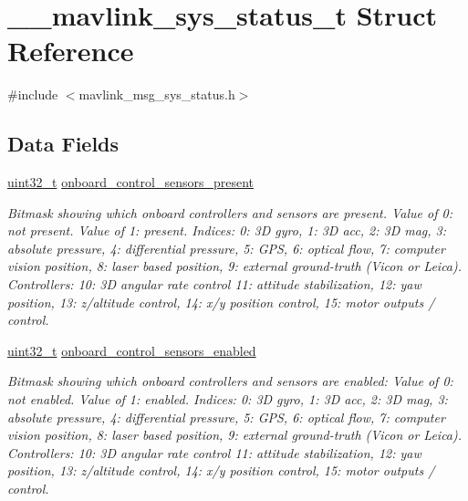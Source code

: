 \hypertarget{struct____mavlink__sys__status__t}{\section{\-\_\-\-\_\-mavlink\-\_\-sys\-\_\-status\-\_\-t Struct Reference}
\label{struct____mavlink__sys__status__t}
}


{\ttfamily \#include $<$mavlink\-\_\-msg\-\_\-sys\-\_\-status.\-h$>$}

\subsection*{Data Fields}
\begin{DoxyCompactItemize}
\item 
\hyperlink{stdint_8h_a435d1572bf3f880d55459d9805097f62}{uint32\-\_\-t} \hyperlink{struct____mavlink__sys__status__t_a9c506f0a78266af5a1230eb1a0ca78b9}{onboard\-\_\-control\-\_\-sensors\-\_\-present}
\begin{DoxyCompactList}\small\item\em Bitmask showing which onboard controllers and sensors are present. Value of 0\-: not present. Value of 1\-: present. Indices\-: 0\-: 3\-D gyro, 1\-: 3\-D acc, 2\-: 3\-D mag, 3\-: absolute pressure, 4\-: differential pressure, 5\-: G\-P\-S, 6\-: optical flow, 7\-: computer vision position, 8\-: laser based position, 9\-: external ground-\/truth (Vicon or Leica). Controllers\-: 10\-: 3\-D angular rate control 11\-: attitude stabilization, 12\-: yaw position, 13\-: z/altitude control, 14\-: x/y position control, 15\-: motor outputs / control. \end{DoxyCompactList}\item 
\hyperlink{stdint_8h_a435d1572bf3f880d55459d9805097f62}{uint32\-\_\-t} \hyperlink{struct____mavlink__sys__status__t_ac7217643b5de2bd8fe861b0c9ff7277c}{onboard\-\_\-control\-\_\-sensors\-\_\-enabled}
\begin{DoxyCompactList}\small\item\em Bitmask showing which onboard controllers and sensors are enabled\-: Value of 0\-: not enabled. Value of 1\-: enabled. Indices\-: 0\-: 3\-D gyro, 1\-: 3\-D acc, 2\-: 3\-D mag, 3\-: absolute pressure, 4\-: differential pressure, 5\-: G\-P\-S, 6\-: optical flow, 7\-: computer vision position, 8\-: laser based position, 9\-: external ground-\/truth (Vicon or Leica). Controllers\-: 10\-: 3\-D angular rate control 11\-: attitude stabilization, 12\-: yaw position, 13\-: z/altitude control, 14\-: x/y position control, 15\-: motor outputs / control. \end{DoxyCompactList}\item 

\end{DoxyCompactItemize}
